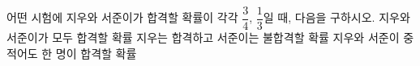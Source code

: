 어떤 시험에 지우와 서준이가 합격할 확률이 각각 $\dfrac{3}{4}$, $\dfrac{1}{3}$일 때, 다음을 구하시오. 
 지우와 서준이가 모두 합격할 확률
 지우는 합격하고 서준이는 불합격할 확률
 지우와 서준이 중 적어도 한 명이 합격할 확률
